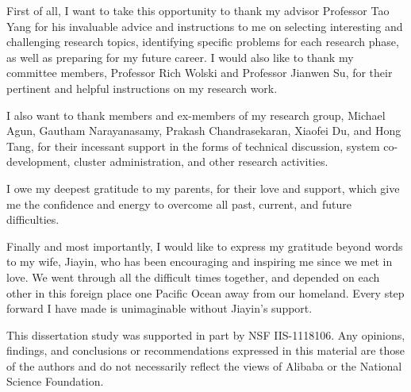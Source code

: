 \begin{acknowledgements}

First of all, I want to take this opportunity to thank my advisor Professor Tao Yang for 
his invaluable advice and instructions to me on selecting interesting and challenging
research topics, identifying specific problems for each research phase, 
as well as preparing for my future career. I would also like to thank my committee
members, Professor Rich Wolski and Professor Jianwen Su, for their pertinent and helpful
instructions on my research work. 

I also want to thank members and ex-members of my research group, Michael Agun, Gautham Narayanasamy,
Prakash Chandrasekaran, Xiaofei Du, and Hong Tang, 
for their incessant support in the forms of technical discussion, 
system co-development, cluster administration, and other research activities.

I owe my deepest gratitude to my parents, for their love and support, which give 
me the confidence and energy to overcome all past, current, and future difficulties. 

Finally and most importantly, I would like to express my gratitude beyond 
words to my wife, Jiayin, who has been encouraging and inspiring me 
since we met in love. We went through all the difficult times together,
and depended on each other in this foreign place one Pacific Ocean away from our homeland.
Every step forward I have made is unimaginable without Jiayin's support.

This dissertation study was supported in part by NSF IIS-1118106.
Any opinions, findings, and conclusions or recommendations expressed in this material are those of the authors and
do not necessarily reflect the views of Alibaba or the National Science Foundation.
\end{acknowledgements}
